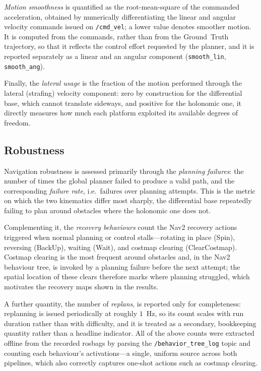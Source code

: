 \emph{Motion smoothness} is quantified as the root-mean-square of the commanded acceleration, obtained by numerically differentiating the linear and angular velocity commands issued on \texttt{/cmd\_vel}; a lower value denotes smoother motion. It is computed from the commands, rather than from the Ground~Truth trajectory, so that it reflects the control effort requested by the planner, and it is reported separately as a linear and an angular component (\texttt{smooth\_lin}, \texttt{smooth\_ang}).

Finally, the \emph{lateral usage} is the fraction of the motion performed through the lateral (strafing) velocity component: zero by construction for the differential base, which cannot translate sideways, and positive for the holonomic one, it directly measures how much each platform exploited its available degrees of freedom.

\subsection{Robustness}
\label{subsec:m-robustness}

Navigation robustness is assessed primarily through the \emph{planning failures}: the number of times the global planner failed to produce a valid path, and the corresponding \emph{failure rate}, i.e.\ failures over planning attempts. This is the metric on which the two kinematics differ most sharply, the differential base repeatedly failing to plan around obstacles where the holonomic one does not.

Complementing it, the \emph{recovery behaviours} count the Nav2 recovery actions triggered when normal planning or control stalls---rotating in place (Spin), reversing (BackUp), waiting (Wait), and costmap clearing (ClearCostmap). Costmap clearing is the most frequent around obstacles and, in the Nav2 behaviour tree, is invoked by a planning failure before the next attempt; the spatial location of these clears therefore marks where planning struggled, which motivates the recovery maps shown in the results.

A further quantity, the number of \emph{replans}, is reported only for completeness: replanning is issued periodically at roughly $1$~Hz, so its count scales with run duration rather than with difficulty, and it is treated as a secondary, bookkeeping quantity rather than a headline indicator. All of the above counts were extracted offline from the recorded rosbags by parsing the \texttt{/behavior\_tree\_log} topic and counting each behaviour's activations---a single, uniform source across both pipelines, which also correctly captures one-shot actions such as costmap clearing.

